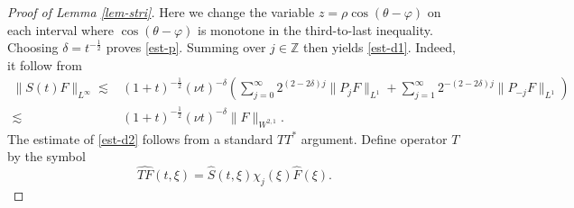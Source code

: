 \documentclass[12pt]{article}
\def\d{\mathrm{d}}
\newcommand{\nm}[2]{\left\| #1 \right\| _{#2} }
\numberwithin{equation}{section}
\begin{document}
\begin{proof}[Proof of Lemma \ref{lem-stri}]
  	Here we change the variable $z=\rho\cos(\theta-\varphi)$ on each interval where $\cos(\theta-\varphi)$ is monotone in the third-to-last inequality.
  	Choosing $\delta=t^{-\frac{1}{2}}$ proves \eqref{est-p}. Summing over $j\in\mathbb{Z}$ then yields \eqref{est-d1}. Indeed, it follow from
    \begin{align*}
  		\|S(t)F\|_{L^\infty}\lesssim& (1+t)^{-\frac{1}{2}}(\nu t)^{-\delta}
  		\left(\sum_{j=0}^{\infty}2^{(2-2\delta)j}\|P_j F\|_{L^1}+\sum_{j=1}^{\infty}2^{-(2-2\delta)j}\|P_{-j} F\|_{L^1}\right)\\
  		\lesssim&(1+t)^{-\frac{1}{2}}(\nu t)^{-\delta}\|F\|_{W^{2,1}}.
  	\end{align*}
    The estimate of \eqref{est-d2} follows from a standard $TT^*$ argument. 
  	Define operator $T$ by the symbol
  	\begin{equation*}
  		\widehat{TF}(t,\xi)=\hat{S}(t,\xi)\chi_j(\xi)\hat{F}(\xi).
  	\end{equation*}
    

\end{proof}
\end{document}
